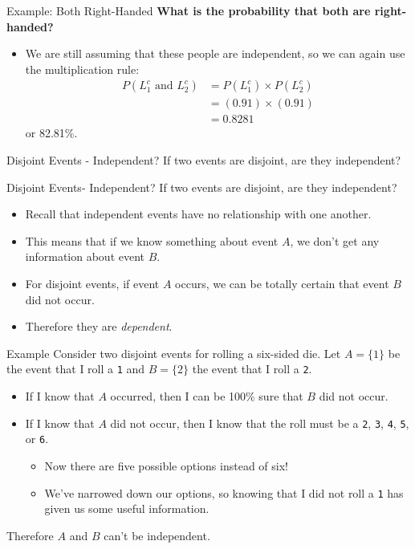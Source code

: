 \begin{frame}{Example: Both Right-Handed}
    \textbf{What is the probability that both are right-handed?}
    \begin{itemize}
        \item We are still assuming that these people are independent, so we can again use the multiplication rule:
        \begin{align*}
        P(L_1^c\text{ and }L_2^c) &= P(L_1^c) \times P(L_2^c) \\
        &= (0.91)\times(0.91) \\
        &= 0.8281
        \end{align*}
        or 82.81\%.
    \end{itemize}
\end{frame}

\begin{frame}{Disjoint Events - Independent?}
    If two events are disjoint, are they independent?
\end{frame}

\begin{frame}{Disjoint Events- Independent?}
    If two events are disjoint, are they independent?
    \begin{itemize}
        \item Recall that independent events have no relationship with one another.
        \item This means that if we know something about event $A$, we don't get any information about event $B$.
        \item For disjoint events, if event $A$ occurs, we can be totally certain that event $B$ did not occur.
        \item Therefore they are \textit{dependent}.
    \end{itemize}
\end{frame}

\begin{frame}{Example}
    Consider two disjoint events for rolling a six-sided die. Let $A=\{1\}$ be the event that I roll a \texttt{1} and $B=\{2\}$ the event that I roll a \texttt{2}. 
    \begin{itemize}
        \item If I know that $A$ occurred, then I can be 100\% sure that $B$ did not occur.
        \item If I know that $A$ did not occur, then I know that the roll must be a \texttt{2}, \texttt{3}, \texttt{4}, \texttt{5}, or \texttt{6}. 
        \begin{itemize}
            \item Now there are five possible options instead of six!
            \item We've narrowed down our options, so knowing that I did not roll a \texttt{1} has given us some useful information.
        \end{itemize}
    \end{itemize}
    Therefore $A$ and $B$ can't be independent.
\end{frame}
